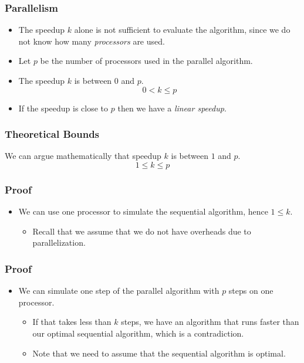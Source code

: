 \documentclass{beamer}
\begin{document}
\begin{CJK}{UTF8}{bsmi}
\begin{frame}
\frametitle{Parallelism}
\begin{itemize}
\item The speedup $k$ alone is not sufficient to evaluate the
  algorithm, since we do not know how many {\em processors} are used.
\item Let $p$ be the number of processors used in the parallel
  algorithm.
\item The speedup $k$ is between $0$ and $p$.
\begin{equation}
0 < k \leq p
\end{equation}
\item If the speedup is close to $p$ then we have a {\em linear
  speedup}.
\end{itemize}
\end{frame}

\begin{frame}
\frametitle{Theoretical Bounds} We can argue mathematically that
speedup $k$ is between $1$ and $p$.
\begin{equation}
1 \leq k \leq p
\end{equation}
\end{frame}


\begin{frame}
\frametitle{Proof}
\begin{itemize}
\item We can use one processor to simulate the sequential algorithm,
  hence $1 \leq k$.
  \begin{itemize}
  \item Recall that we assume that we do not have overheads due to
    parallelization.
  \end{itemize}
\end{itemize}
\end{frame}

\begin{frame}
\frametitle{Proof}
\begin{itemize}
\item We can simulate one step of the parallel algorithm with $p$
  steps on one processor.
\begin{itemize}
  \item If that takes less than $k$ steps, we have an algorithm that
    runs faster than our optimal sequential algorithm, which is a
    contradiction.
  \item Note that we need to assume that the sequential algorithm is
    optimal.
\end{itemize}
\end{itemize}
\end{frame}



\end{CJK}
\end{document}
